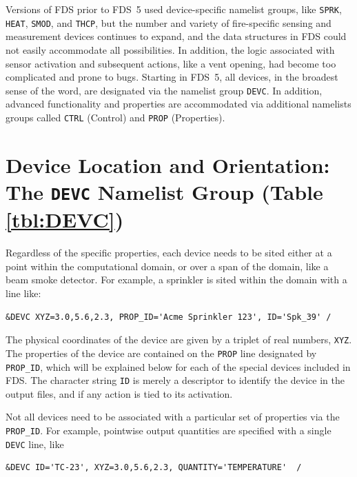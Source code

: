 \documentclass[11pt]{book}
\newcommand{\ct}{\tt\small}
\begin{document}
Versions of FDS prior to FDS~5 used device-specific namelist groups, like {\ct SPRK},
{\ct HEAT}, {\ct SMOD}, and {\ct THCP}, but the number and variety
of fire-specific sensing and measurement devices continues to expand, and
the data structures in FDS could not easily accommodate all possibilities.
In addition, the logic associated with sensor activation and
subsequent actions, like a vent opening, had become too complicated and prone to bugs.
Starting in FDS~5, all devices, in the broadest sense of the word,
are designated via the namelist group {\ct DEVC}.
In addition, advanced functionality and properties are accommodated
via additional namelists groups called {\ct CTRL} (Control) and
{\ct PROP} (Properties).




\section{Device Location and Orientation: The \texorpdfstring{{\tt DEVC}}{DEVC} Namelist Group (Table \ref{tbl:DEVC})}
\label{info:DEVC}

Regardless of the specific properties, each device needs to be sited either at a point within the computational domain, or
over a span of the domain, like a beam smoke detector. For example, a sprinkler is sited within the domain with a line like:

\footnotesize
\begin{verbatim}
&DEVC XYZ=3.0,5.6,2.3, PROP_ID='Acme Sprinkler 123', ID='Spk_39' /
\end{verbatim}
\normalsize

\noindent
The physical coordinates of the
device are given by a triplet of real numbers, {\ct XYZ}.
The properties of the device are contained on the {\ct PROP} line
designated by {\ct PROP\_ID}, which will be explained below for each of the
special devices included in FDS.
The character string {\ct ID} is merely a descriptor to identify the
device in the output files, and if any action is tied to its activation.

Not all devices need to be associated with a particular set of properties via the {\ct PROP\_ID}. For example, pointwise
output quantities are specified with a single {\ct DEVC} line, like

\footnotesize
\begin{verbatim}
&DEVC ID='TC-23', XYZ=3.0,5.6,2.3, QUANTITY='TEMPERATURE'  /
\end{verbatim}
\normalsize
\end{document}
